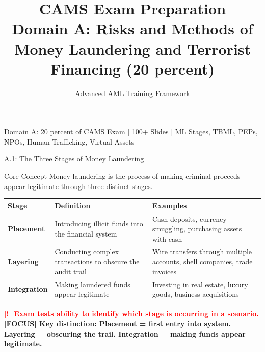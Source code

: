 \documentclass[11pt,a4paper]{beamer}
\title[CAMS Domain A]{CAMS Exam Preparation\\Domain A: Risks and Methods of\\Money Laundering and Terrorist Financing (20 percent)}
\author{Advanced AML Training Framework}
\date{}
\newcommand{\redflag}[1]{\textcolor{red}{\textbf{[!] #1}}}
\newcommand{\examfocus}[1]{\textcolor{orange!80!black}{\textbf{[FOCUS] #1}}}
\begin{document}
	
	\begin{frame}
		\titlepage
		\centering
		\tiny Domain A: 20 percent of CAMS Exam | 100+ Slides | ML Stages, TBML, PEPs, NPOs, Human Trafficking, Virtual Assets
	\end{frame}
	
	
	\begin{frame}{A.1: The Three Stages of Money Laundering}
		\begin{block}{Core Concept}
			Money laundering is the process of making criminal proceeds appear legitimate through three distinct stages.
		\end{block}
		\begin{tabular}{p{}|p{}|p{0.35\textwidth}}
			\hline
			\rowcolor{lightgray}
			\textbf{Stage} & \textbf{Definition} & \textbf{Examples} \\
			\hline
			\textbf{Placement} & Introducing illicit funds into the financial system & Cash deposits, currency smuggling, purchasing assets with cash \\
			\hline
			\textbf{Layering} & Conducting complex transactions to obscure the audit trail & Wire transfers through multiple accounts, shell companies, trade invoices \\
			\hline
			\textbf{Integration} & Making laundered funds appear legitimate & Investing in real estate, luxury goods, business acquisitions \\
			\hline
		\end{tabular}
		\vspace{0.2cm}
		\redflag{Exam tests ability to identify which stage is occurring in a scenario.}
		\examfocus{Key distinction: Placement = first entry into system. Layering = obscuring the trail. Integration = making funds appear legitimate.}
	\end{frame}
	
\end{document}
